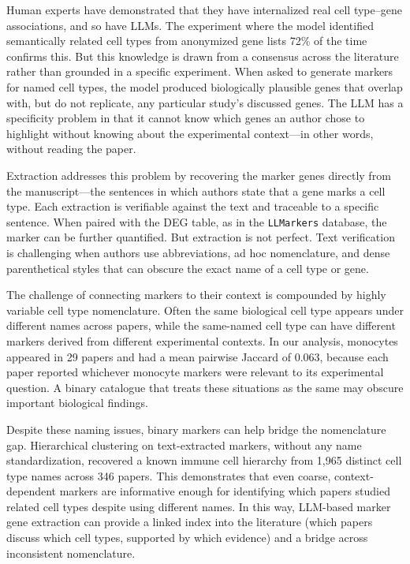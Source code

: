 \documentclass[10pt,twocolumn]{article}
\theoremstyle{plain}
\theoremstyle{definition}
\theoremstyle{remark}
\begin{document}
Human experts have demonstrated that they have internalized real cell type--gene associations, and so have LLMs. The experiment where the model identified semantically related cell types from anonymized gene lists 72\% of the time confirms this. But this knowledge is drawn from a consensus across the literature rather than grounded in a specific experiment. When asked to generate markers for named cell types, the model produced biologically plausible genes that overlap with, but do not replicate, any particular study's discussed genes. The LLM has a specificity problem in that it cannot know which genes an author chose to highlight without knowing about the experimental context---in other words, without reading the paper.

Extraction addresses this problem by recovering the marker genes directly from the manuscript---the sentences in which authors state that a gene marks a cell type. Each extraction is verifiable against the text and traceable to a specific sentence. When paired with the DEG table, as in the \texttt{LLMarkers} database, the marker can be further quantified. But extraction is not perfect. Text verification is challenging when authors use abbreviations, ad hoc nomenclature, and dense parenthetical styles that can obscure the exact name of a cell type or gene.

The challenge of connecting markers to their context is compounded by highly variable cell type nomenclature. Often the same biological cell type appears under different names across papers, while the same-named cell type can have different markers derived from different experimental contexts. In our analysis, monocytes appeared in 29 papers and had a mean pairwise Jaccard of 0.063, because each paper reported whichever monocyte markers were relevant to its experimental question. A binary catalogue that treats these situations as the same may obscure important biological findings.

Despite these naming issues, binary markers can help bridge the nomenclature gap. Hierarchical clustering on text-extracted markers, without any name standardization, recovered a known immune cell hierarchy from 1,965 distinct cell type names across 346 papers. This demonstrates that even coarse, context-dependent markers are informative enough for identifying which papers studied related cell types despite using different names. In this way, LLM-based marker gene extraction can provide a linked index into the literature (which papers discuss which cell types, supported by which evidence) and a bridge across inconsistent nomenclature.
\end{document}
